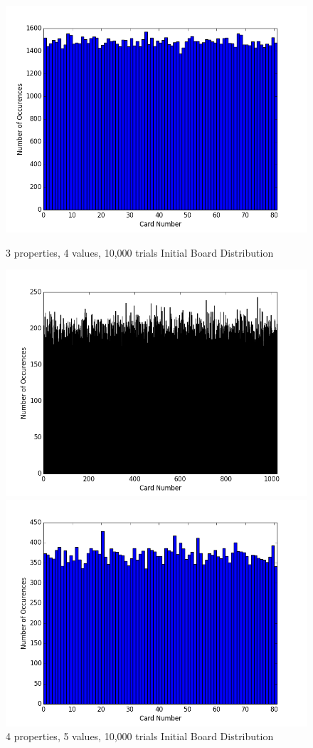 \documentclass[pageno]{jpaper}
\begin{document}
\begin{figure}[htbb]
\begin{minipage}[b]{0.5\linewidth}
\centering
\includegraphics[width=.75\linewidth]{3p4v10000Init.png}
\caption{3 properties, 4 values, 10,000 trials Initial Board Distribution}
\label{fig:init1}
\end{minipage}
\hspace{0.5cm}
\begin{minipage}[b]{0.5\linewidth}
\centering
\includegraphics[width=.75\linewidth]{4p5v10000Init.png}
\caption{4 properties, 5 values, 10,000 trials Initial Board Distribution}
\label{fig:init2}
\end{minipage}
\begin{minipage}[b]{0.5\linewidth}
\centering
\includegraphics[width=.75\linewidth]{3p4v10000Draw.png}

\end{minipage}
\end{figure}
\end{document}
